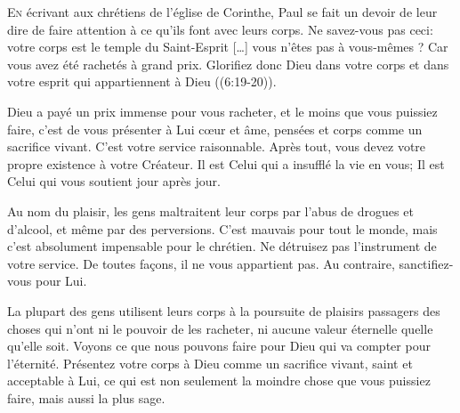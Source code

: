 



\lettrine{E}{n} écrivant aux chrétiens de l'église de Corinthe,
 Paul se fait un devoir de leur dire de faire attention à ce qu'ils
 font avec leurs corps.
 \Og Ne savez-vous pas ceci: votre corps est le temple du Saint-Esprit
 [\dots{}] vous n'êtes pas à vous-mêmes ?
 Car vous avez été rachetés à grand prix. Glorifiez donc Dieu
 dans votre corps et dans votre esprit qui appartiennent à Dieu \Fg{}
 ((6:19-20)).

Dieu a payé un prix immense pour vous racheter,
 et le moins que vous puissiez faire, c'est de vous présenter à Lui
 \ocadr c\oe{}ur et âme, pensées et corps \fcadr{} comme un sacrifice vivant.
 C'est votre service raisonnable. Après tout, vous devez votre propre
 existence à votre Créateur. Il est Celui qui a insufflé la vie en vous;
 Il est Celui qui vous soutient jour après jour.


Au nom du plaisir, les gens maltraitent leur corps par l'abus de drogues
 et d'alcool, et même par des perversions. 
 C'est mauvais pour tout le monde,
 mais c'est absolument impensable pour le chrétien.
 Ne détruisez pas l'instrument de votre service. De toutes fa\c{c}ons,
 il ne vous appartient pas. Au contraire, sanctifiez-vous pour Lui.

La plupart des gens utilisent leurs corps à la poursuite de plaisirs passagers
 \ocadr des choses qui n'ont ni le pouvoir de les racheter, ni aucune valeur éternelle
 quelle qu'elle soit. Voyons ce que nous pouvons faire pour Dieu qui va compter
 pour l'éternité. Présentez votre corps à Dieu comme un sacrifice vivant,
 saint et acceptable à Lui, ce qui est non seulement la moindre chose
 que vous puissiez faire, mais aussi la plus sage.

